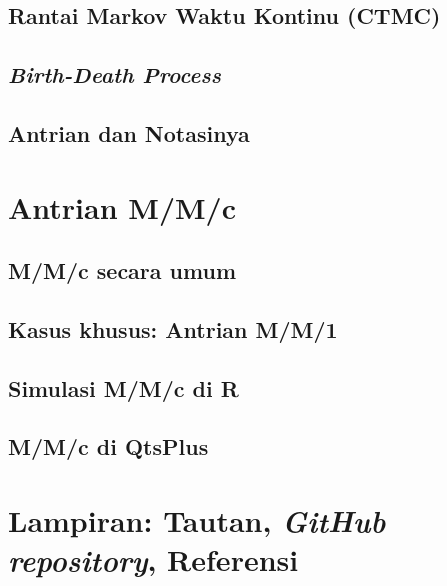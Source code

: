 \documentclass{beamer}
\begin{document}
\subsection{Rantai Markov Waktu Kontinu (CTMC)}

\subsection{\textit{Birth-Death Process}}

\subsection{Antrian dan Notasinya}

\section{Antrian M/M/c}

\subsection{M/M/c secara umum}

\subsection{Kasus khusus: Antrian M/M/1}

\subsection{Simulasi M/M/c di R}

\subsection{M/M/c di QtsPlus}

\section{Lampiran: Tautan, \textit{GitHub repository}, Referensi}
\end{document}
